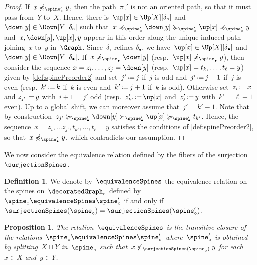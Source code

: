 \documentclass{amsart}
\newtheorem{proposition}[theorem]{Proposition}
\theoremstyle{definition}
\newtheorem{definition}[theorem]{Definition}
\newcommand{\eqdef}{\mbox{\,\raisebox{0.2ex}{\scriptsize\ensuremath{\mathrm:}}\ensuremath{=}\,}} %
\newcommand{\decoration}{\delta}
\begin{document}
\begin{proof}
  If~$x \not\preccurlyeq_{\spine_\circ'} y$, then the path~$\pi_\circ'$ is not an oriented path, so that it must pass from~$Y$ to~$X$. %
  Hence, there is~$\up[x] \in \Up[X][\decoration_\circ]$ and~$\down[y] \in \Down[Y][\decoration_\circ]$ such that~$x \preccurlyeq_{\spine_\circ'} \down[y] \succcurlyeq_{\spine_\circ'} \up[x] \preccurlyeq_{\spine_\circ'} y$ and~$x, \down[y], \up[x], y$ appear in this order along the unique induced path joining~$x$ to~$y$ in~$\Graph$.
  Since~$\decoration_\circ$ refines $\decoration_\bullet$, we have~$\up[x] \in \Up[X][\decoration_\bullet]$ and~$\down[y] \in \Down[Y][\decoration_\bullet]$.
  If~$x \not\preccurlyeq_{\spine_\bullet} \down[y]$ (resp.~$\up[x] \not\preccurlyeq_{\spine_\bullet} y$), then consider the sequence $x = z_i, \dots, z_j = \down[y]$ (resp.~$\up[x] = t_k, \dots, t_\ell = y$) given by \cref{def:spinePreorder2} and set~$j' \eqdef j$ if~$j$ is odd and~$j' \eqdef j-1$ if~$j$ is even (resp.~$k' \eqdef k$ if~$k$ is even and~$k' \eqdef j+1$ if~$k$ is odd).
  Otherwise set~$z_i \eqdef x$ and $z_{j'} \eqdef y$ with~$i+1 = j'$ odd (resp.~$z'_{k'} \eqdef \up[x]$ and~$z'_\ell \eqdef y$ with~$k' = \ell-1$ even).
  Up to a global shift, we can moreover assume that~$j' = k'-1$.
  Note that by construction~$z_{j'} \succcurlyeq_{\spine_\bullet'} \down[y] \succ_{\spine_\bullet'} \up[x] \succcurlyeq_{\spine_\bullet'} t_{k'}$.
  Hence, the sequence~$x = z_i, \dots z_{j'}, t_{k'}, \dots, t_\ell = y$ satisfies the conditions of \cref{def:spinePreorder2}, so that~$x \not\preccurlyeq_{\spine_\bullet'} y$, which contradicts our assumption.
\end{proof}

We now consider the equivalence relation defined by the fibers of the surjection~$\surjectionSpines$.

\begin{definition}
  \label{def:equivalenceRelation}
  We denote by~$\equivalenceSpines$ the equivalence relation on the spines on~$\decoratedGraph_\circ$ defined by $\spine_\circ \equivalenceSpines \spine_\circ'$ if and only if~$\surjectionSpines(\spine_\circ) = \surjectionSpines(\spine_\circ')$.
\end{definition}

\begin{proposition}
  \label{prop:equivalenceRelation}
  The relation~$\equivalenceSpines$ is the transitive closure of the relations~$\spine_\circ \equivalenceSpines \spine_\circ'$ where~$\spine_\circ'$ is obtained by splitting~$X \sqcup Y$ in~$\spine_\circ$ such that~${x \not\succcurlyeq_{\surjectionSpines(\spine_\circ)} y}$ for each~$x \in X$ and~$y \in Y$.
\end{proposition}
\end{document}
